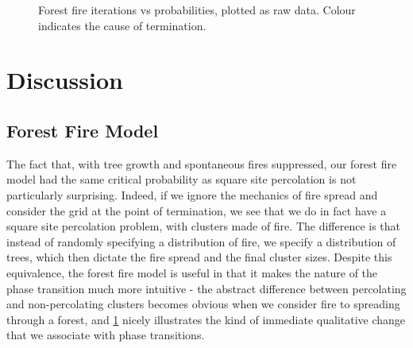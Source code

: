 \documentclass[%
 reprint,
 amsmath,amssymb,
 aps,
]{revtex4-2}
\begin{document}
\begin{figure}
    \centering
    \caption{Forest fire iterations vs probabilities, plotted as raw data. Colour indicates the cause of termination.}
    \label{fig:FF_rawdata}
\end{figure}


\section{Discussion}
\subsection{Forest Fire Model}
The fact that, with tree growth and spontaneous fires suppressed, our forest fire model had the same critical probability as square site percolation is not particularly surprising. Indeed, if we ignore the mechanics of fire spread and consider the grid at the point of termination, we see that we do in fact have a square site percolation problem, with clusters made of fire. The difference is that instead of randomly specifying a distribution of fire, we specify a distribution of trees, which then dictate the fire spread and the final cluster sizes. Despite this equivalence, the forest fire model is useful in that it makes the nature of the phase transition much more intuitive - the abstract difference between percolating and non-percolating clusters becomes obvious when we consider fire to spreading through a forest, and \cref{fig:FF_rawdata} nicely illustrates the kind of immediate qualitative change that we associate with phase transitions. 
\end{document}
